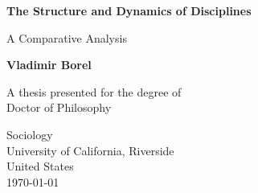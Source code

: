 \begin{titlepage}
    \begin{center}
        \vspace*{1cm}
 
        \textbf{The Structure and Dynamics of Disciplines}
 
        \vspace{0.5cm}
         A Comparative Analysis
             
        \vspace{1.5cm}
 
        \textbf{Vladimir Borel}
 
        \vfill
             
        A thesis presented for the degree of\\
        Doctor of Philosophy
             
        \vspace{0.8cm}
      
             
        Sociology\\
        University of California, Riverside\\
        United States\\
        \today
             
    \end{center}
 \end{titlepage}
 